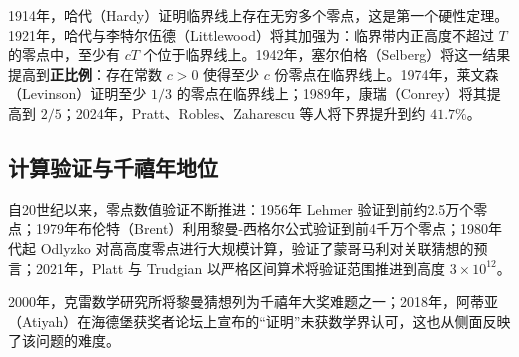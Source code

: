 1914年，哈代（Hardy）证明临界线上存在无穷多个零点\cite{hardy1914zeroes}，这是第一个硬性定理。1921年，哈代与李特尔伍德（Littlewood）将其加强为：临界带内正高度不超过 $T$ 的零点中，至少有 $cT$ 个位于临界线上\cite{hardy1921zeros}。1942年，塞尔伯格（Selberg）将这一结果提高到\textbf{正比例}：存在常数 $c > 0$ 使得至少 $c$ 份零点在临界线上\cite{selberg1942zeros}。1974年，莱文森（Levinson）证明至少 $1/3$ 的零点在临界线上\cite{levinson1974zeros}；1989年，康瑞（Conrey）将其提高到 $2/5$\cite{conrey1989zeros}；2024年，Pratt、Robles、Zaharescu 等人将下界提升到约 $41.7\%$\cite{pratt2024zeros}。

\subsection{计算验证与千禧年地位}

自20世纪以来，零点数值验证不断推进：1956年 Lehmer 验证到前约2.5万个零点；1979年布伦特（Brent）利用黎曼-西格尔公式验证到前4千万个零点\cite{brent1979zeros}；1980年代起 Odlyzko 对高高度零点进行大规模计算，验证了蒙哥马利对关联猜想的预言\cite{odlyzko1987zeros}；2021年，Platt 与 Trudgian 以严格区间算术将验证范围推进到高度 $3 \times 10^{12}$\cite{platt2021verification}。

2000年，克雷数学研究所将黎曼猜想列为千禧年大奖难题之一；2018年，阿蒂亚（Atiyah）在海德堡获奖者论坛上宣布的“证明”未获数学界认可，这也从侧面反映了该问题的难度。
